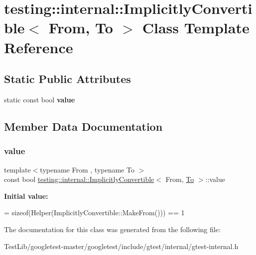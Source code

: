 \hypertarget{classtesting_1_1internal_1_1ImplicitlyConvertible}{}\section{testing\+:\+:internal\+:\+:Implicitly\+Convertible$<$ From, To $>$ Class Template Reference}
\label{classtesting_1_1internal_1_1ImplicitlyConvertible}
\subsection*{Static Public Attributes}
\begin{DoxyCompactItemize}
\item 
static const bool {\bfseries value}
\end{DoxyCompactItemize}


\subsection{Member Data Documentation}
\mbox{\label{classtesting_1_1internal_1_1ImplicitlyConvertible_aea51cecabca681fb75659e224771b7b7}} 
\subsubsection{\texorpdfstring{value}{value}}
{\footnotesize\ttfamily template$<$typename From , typename To $>$ \\
const bool \hyperlink{classtesting_1_1internal_1_1ImplicitlyConvertible}{testing\+::internal\+::\+Implicitly\+Convertible}$<$ From, \hyperlink{classtesting_1_1internal_1_1To}{To} $>$\+::value\hspace{0.3cm}{\ttfamily [static]}}

{\bfseries Initial value\+:}
\begin{DoxyCode}
=
      \textcolor{keyword}{sizeof}(Helper(ImplicitlyConvertible::MakeFrom())) == 1
\end{DoxyCode}


The documentation for this class was generated from the following file\+:\begin{DoxyCompactItemize}
\item 
Test\+Lib/googletest-\/master/googletest/include/gtest/internal/gtest-\/internal.\+h\end{DoxyCompactItemize}
